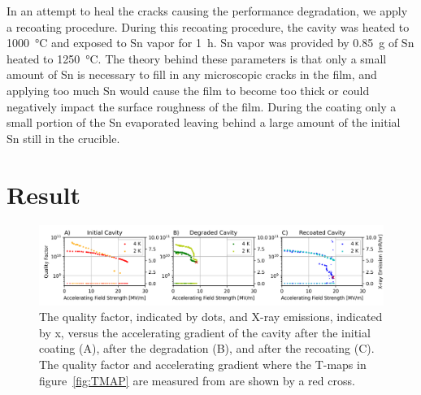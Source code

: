 \documentclass{revtex4-2}
\begin{document}
In an attempt to heal the cracks causing the performance degradation, we apply a recoating procedure. During this recoating procedure, the cavity was heated to \qty{1000}{\degreeCelsius} and exposed to Sn vapor for \qty{1}{\hour}. Sn vapor was provided by \qty{0.85}{\gram} of Sn heated to \qty{1250}{\degreeCelsius}. The theory behind these parameters is that only a small amount of Sn is necessary to fill in any microscopic cracks in the film, and applying too much Sn would cause the film to become too thick or could negatively impact the surface roughness of the film. During the coating only a small portion of the Sn evaporated leaving behind a large amount of the initial Sn still in the crucible. 

\section{Result}
\label{sec:Results}

\begin{figure}[h]%
    \centering%
    \includegraphics[width=1.0\columnwidth]{./figures/VTS.png}%
    \caption{The quality factor, indicated by dots, and X-ray emissions, indicated by x, versus the accelerating gradient of the cavity after the initial coating (A), after the degradation (B), and after the recoating (C). The quality factor and accelerating gradient where the T-maps in figure~{\protect\ref{fig:TMAP}} are measured from are shown by a red cross.}%
    \label{fig:VTS}%
\end{figure}
\end{document}
